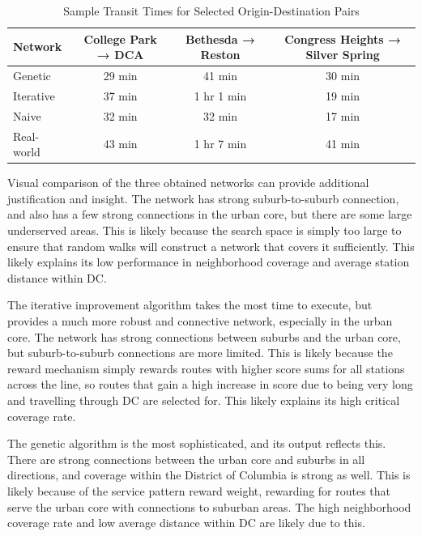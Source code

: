 \documentclass[manuscript,nonacm]{acmart}
\begin{document}
\begin{table}[h]
\caption{Sample Transit Times for Selected Origin-Destination Pairs}
\label{tab:transittimes}
\begin{tabular}{lccc}
\toprule
\textbf{Network} & \textbf{College Park → DCA} & \textbf{Bethesda → Reston} & \textbf{Congress Heights → Silver Spring} \\
\midrule
Genetic & 29 min & 41 min & 30 min \\
Iterative & 37 min & 1 hr 1 min & 19 min \\
Naive & 32 min & 32 min & 17 min \\
\midrule
Real-world & 43 min & 1 hr 7 min & 41 min \\
\bottomrule
\end{tabular}
\end{table}

Visual comparison of the three obtained networks can provide additional justification and insight. The network has strong suburb-to-suburb connection, and also has a few strong connections in the urban core, but there are some large underserved areas. This is likely because the search space is simply too large to ensure that random walks will construct a network that covers it sufficiently. This likely explains its low performance in neighborhood coverage and average station distance within DC.

The iterative improvement algorithm takes the most time to execute, but provides a much more robust and connective network, especially in the urban core. The network has strong connections between suburbs and the urban core, but suburb-to-suburb connections are more limited. This is likely because the reward mechanism simply rewards routes with higher score sums for all stations across the line, so routes that gain a high increase in score due to being very long and travelling through DC are selected for. This likely explains its high critical coverage rate.

The genetic algorithm is the most sophisticated, and its output reflects this. There are strong connections between the urban core and suburbs in all directions, and coverage within the District of Columbia is strong as well. This is likely because of the service pattern reward weight, rewarding for routes that serve the urban core with connections to suburban areas. The high neighborhood coverage rate and low average distance within DC are likely due to this.
\end{document}
